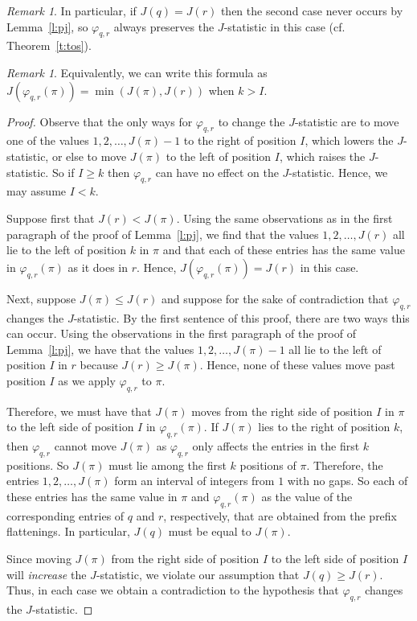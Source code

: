 \documentclass[11pt]{amsart}   %
\theoremstyle{definition}
\theoremstyle{remark}
\newtheorem{remark}[theorem]{Remark}
\numberwithin{equation}{section}
\theoremstyle{theorem}
\newcommand{\f}[0]{\varphi}
\begin{document}
\begin{remark}
In particular, if $J(q) = J(r)$ then the second case never occurs by Lemma~\ref{l:pj}, so $\f_{q,r}$ always preserves the $J$-statistic in this case (cf. Theorem~\ref{t:tos}).
\end{remark}

\begin{remark}
Equivalently, we can write this formula as $J(\f_{q,r}(\pi)) = \min\left( J(\pi), J(r) \right)$ when $k > I$.
\end{remark}

\begin{proof}
Observe that the only ways for $\f_{q,r}$ to change the $J$-statistic are to move one of the values $1, 2, \ldots, J(\pi)-1$ to the right of position $I$, which lowers the $J$-statistic, or else to move $J(\pi)$ to the left of position $I$, which raises the $J$-statistic.  So if $I \geq k$ then $\f_{q,r}$ can have no effect on the $J$-statistic.  Hence, we may assume $I < k$.

Suppose first that $J(r) < J(\pi)$.  Using the same observations as in the first paragraph of the proof of Lemma~\ref{l:pj}, we find that the values $1, 2, \ldots, J(r)$ all lie to the left of position $k$ in $\pi$ and that each of these entries has the same value in $\f_{q,r}(\pi)$ as it does in $r$.  Hence, $J(\f_{q,r}(\pi)) = J(r)$ in this case.

Next, suppose $J(\pi) \leq J(r)$ and suppose for the sake of contradiction that $\f_{q,r}$ changes the $J$-statistic.  By the first sentence of this proof, there are two ways this can occur.  Using the observations in the first paragraph of the proof of Lemma~\ref{l:pj}, we have that the values $1, 2, \ldots, J(\pi)-1$ all lie to the left of position $I$ in $r$ because $J(r) \geq J(\pi)$.  Hence, none of these values move past position $I$ as we apply $\f_{q,r}$ to $\pi$.  

Therefore, we must have that $J(\pi)$ moves from the right side of position $I$ in $\pi$ to the left side of position $I$ in $\f_{q,r}(\pi)$.  If $J(\pi)$ lies to the right of position $k$, then $\f_{q,r}$ cannot move $J(\pi)$ as $\f_{q,r}$ only affects the entries in the first $k$ positions.  So $J(\pi)$ must lie among the first $k$ positions of $\pi$.  Therefore, the entries $1, 2, \ldots, J(\pi)$ form an interval of integers from $1$ with no gaps.  So each of these entries has the same value in $\pi$ and $\f_{q,r}(\pi)$ as the value of the corresponding entries of $q$ and $r$, respectively, that are obtained from the prefix flattenings.  In particular, $J(q)$ must be equal to $J(\pi)$.

Since moving $J(\pi)$ from the right side of position $I$ to the left side of position $I$ will {\em increase} the $J$-statistic, we violate our assumption that $J(q) \geq J(r)$.  Thus, in each case we obtain a contradiction to the hypothesis that $\f_{q,r}$ changes the $J$-statistic.
\end{proof}
\end{document}
